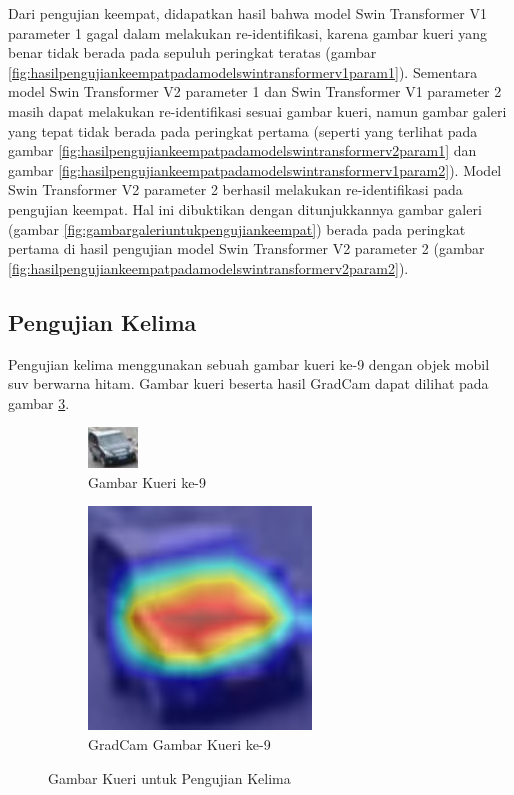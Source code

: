 Dari pengujian keempat, didapatkan hasil bahwa model Swin Transformer V1 parameter 1 gagal dalam melakukan re-identifikasi, 
karena gambar kueri yang benar tidak berada pada sepuluh peringkat teratas (gambar 
\ref{fig:hasilpengujiankeempatpadamodelswintransformerv1param1}). Sementara model Swin Transformer V2 parameter 1 dan 
Swin Transformer V1 parameter 2 masih dapat melakukan re-identifikasi sesuai gambar kueri, namun gambar galeri yang tepat 
tidak berada pada peringkat pertama (seperti yang terlihat pada gambar \ref{fig:hasilpengujiankeempatpadamodelswintransformerv2param1} 
dan gambar \ref{fig:hasilpengujiankeempatpadamodelswintransformerv1param2}). Model Swin Transformer V2 parameter 2 berhasil 
melakukan re-identifikasi pada pengujian keempat. Hal ini dibuktikan dengan ditunjukkannya gambar galeri 
(gambar \ref{fig:gambargaleriuntukpengujiankeempat}) berada pada peringkat pertama di hasil pengujian model Swin Transformer 
V2 parameter 2 (gambar \ref{fig:hasilpengujiankeempatpadamodelswintransformerv2param2}).

\subsection{Pengujian Kelima}

Pengujian kelima menggunakan sebuah gambar kueri ke-9 dengan objek mobil suv berwarna hitam. Gambar kueri 
beserta hasil GradCam dapat dilihat pada gambar \ref{fig:gambarkueriuntukpengujiankelima}.

\begin{figure}[h!]
  \centering
  \begin{subfigure}{.5\textwidth}
    \centering
    \includegraphics[width=.4\linewidth]{gambar/Que9_1019.jpg}
    \caption{Gambar Kueri ke-9}
    \label{gambarkuerinomorsembilan}
  \end{subfigure}%
  \begin{subfigure}{.5\textwidth}
    \centering
    \includegraphics[width=.4\linewidth]{gambar/GradCamQue9_1019.jpg}
    \caption{GradCam Gambar Kueri ke-9}
    \label{gradcamgambarkuerinomorsembilan}
  \end{subfigure}
  \caption{Gambar Kueri untuk Pengujian Kelima}
  \label{fig:gambarkueriuntukpengujiankelima}
\end{figure}

